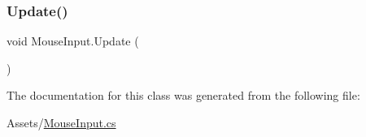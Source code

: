 \subsubsection{\texorpdfstring{Update()}{Update()}}
{\footnotesize\ttfamily void Mouse\+Input.\+Update (\begin{DoxyParamCaption}{ }\end{DoxyParamCaption})\hspace{0.3cm}{\ttfamily [private]}}



The documentation for this class was generated from the following file\+:\begin{DoxyCompactItemize}
\item 
Assets/\hyperlink{_mouse_input_8cs}{Mouse\+Input.\+cs}\end{DoxyCompactItemize}

